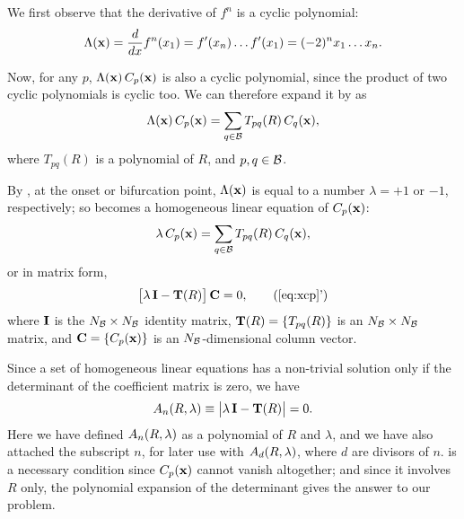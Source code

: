 \documentclass{ws-ijbc}
\begin{document}
We first observe that the derivative of $f^n$
is a cyclic polynomial:
%
\begin{equation}
  \Lambda(\mathbf{x})
   = \frac{d}{dx}f^{n}(x_1)
   = f'(x_n) \dots f'(x_1)
   = (-2)^n x_1 \dots x_n.
\label{eq:logder}
\end{equation}



Now, for any $p$, $\Lambda(\mathbf{x}) \, C_p(\mathbf{x})$
  is also a cyclic polynomial,
since the product of two cyclic polynomials is cyclic too.
We can therefore expand it by  as
\begin{equation}
  \Lambda(\mathbf{x}) \, C_p(\mathbf{x}) = \sum_{q \in \mathcal B} T_{pq}(R) \, C_q(\mathbf{x}),
\label{eq:xcp0}
\end{equation}
where $T_{pq}(R)$ is a polynomial of $R$,
and $p, q \in \mathcal B$.



By , at the onset or bifurcation point,
  $\Lambda(\mathbf{x})$ is equal to a number
  $\lambda = +1$ or $-1$, respectively;
  so 
  becomes a homogeneous linear equation of
  $C_p(\mathbf{x})$:
\begin{equation}
  \lambda \, C_p(\mathbf{x}) = \sum_{q \in \mathcal B} T_{pq}(R) \, C_q(\mathbf{x}),
\label{eq:xcp}
\end{equation}
%
%
or in matrix form,
\begin{equation}
  \big[ \lambda \, \vct I - \vct T(R) \big] \, \vct C = 0,
\tag{\ref{eq:xcp}'}
\end{equation}
%
%
where
$\mathbf{I}$ is the $N_\mathcal B \times N_\mathcal B$ identity matrix,
$\mathbf{T}(R) = \{T_{pq}(R)\}$ is an $N_\mathcal B \times N_\mathcal B$ matrix,
and
$\mathbf{C} = \{C_p(\mathbf{x})\}$ is an $N_\mathcal B$-dimensional column vector.




Since a set of homogeneous linear equations
  has a non-trivial solution
  only if the determinant of the coefficient matrix
  is zero, we have
\begin{equation}
  A_n(R, \lambda) \equiv \big| \lambda \, \mathbf{I} - \mathbf{T}(R) \big| = 0.
\label{eq:xr}
\end{equation}
Here we have defined $A_n(R, \lambda)$ as a polynomial of $R$ and $\lambda$,
  and we have also attached the subscript $n$,
  for later use with $A_d(R, \lambda)$, where $d$ are divisors of $n$.
 is a necessary condition
  since $C_p(\mathbf{x})$ cannot vanish altogether;
and since it involves $R$ only,
  the polynomial expansion of the determinant
  gives the answer to our problem.
\end{document}
